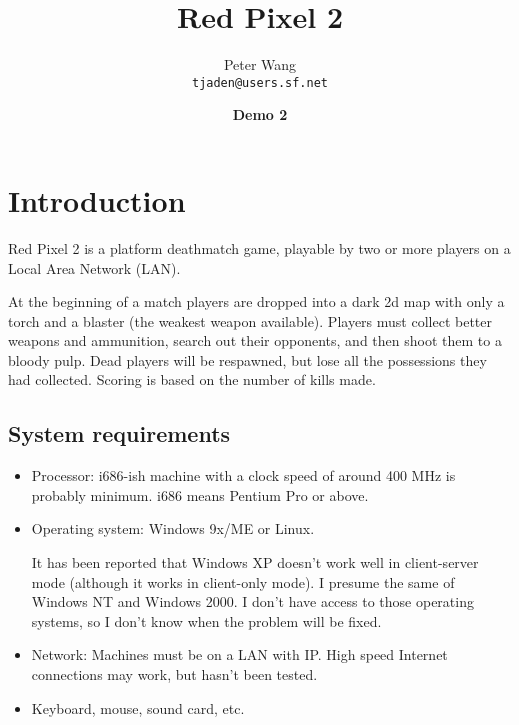 \documentclass[a4paper]{article}
\begin{document}
\newcommand{\key}[1]{\fbox{\texttt{#1}}}


\title{\textbf{Red Pixel 2}}
\date{\textbf{Demo 2}}
\author{Peter Wang\\
\texttt{tjaden@users.sf.net}}
\maketitle

\tableofcontents
\newpage


\section{Introduction}

Red Pixel 2 is a platform deathmatch game, playable by two or more
players on a Local Area Network (LAN).

At the beginning of a match players are dropped into a dark 2d map
with only a torch and a blaster (the weakest weapon available).
Players must collect better weapons and ammunition, search out their
opponents, and then shoot them to a bloody pulp.  Dead players will be
respawned, but lose all the possessions they had collected.  Scoring
is based on the number of kills made.


\subsection{System requirements}

\begin{itemize}

\item Processor: i686-ish machine with a clock speed of around 400 MHz
  is probably minimum.  i686 means Pentium Pro or above.

\item Operating system: Windows 9x/ME or Linux.

  It has been reported that Windows XP doesn't work well in
  client-server mode (although it works in client-only mode).  I
  presume the same of Windows NT and Windows 2000.  I don't have
  access to those operating systems, so I don't know when the problem
  will be fixed.

\item Network: Machines must be on a LAN with IP.  High speed Internet
  connections may work, but hasn't been tested.

\item Keyboard, mouse, sound card, etc.

\end{itemize}
\end{document}
